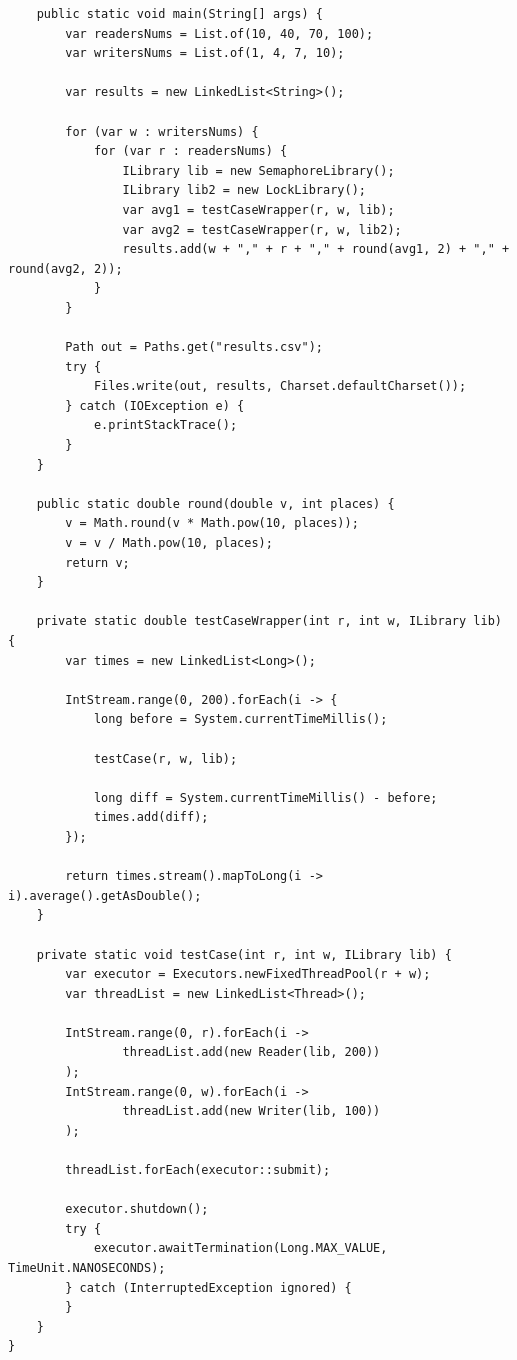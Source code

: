 \documentclass[12pt]{article}
\begin{document}
\begin{verbatim}
    public static void main(String[] args) {
        var readersNums = List.of(10, 40, 70, 100);
        var writersNums = List.of(1, 4, 7, 10);

        var results = new LinkedList<String>();

        for (var w : writersNums) {
            for (var r : readersNums) {
                ILibrary lib = new SemaphoreLibrary();
                ILibrary lib2 = new LockLibrary();
                var avg1 = testCaseWrapper(r, w, lib);
                var avg2 = testCaseWrapper(r, w, lib2);
                results.add(w + "," + r + "," + round(avg1, 2) + "," + round(avg2, 2));
            }
        }

        Path out = Paths.get("results.csv");
        try {
            Files.write(out, results, Charset.defaultCharset());
        } catch (IOException e) {
            e.printStackTrace();
        }
    }

    public static double round(double v, int places) {
        v = Math.round(v * Math.pow(10, places));
        v = v / Math.pow(10, places);
        return v;
    }

    private static double testCaseWrapper(int r, int w, ILibrary lib) {
        var times = new LinkedList<Long>();

        IntStream.range(0, 200).forEach(i -> {
            long before = System.currentTimeMillis();

            testCase(r, w, lib);

            long diff = System.currentTimeMillis() - before;
            times.add(diff);
        });

        return times.stream().mapToLong(i -> i).average().getAsDouble();
    }

    private static void testCase(int r, int w, ILibrary lib) {
        var executor = Executors.newFixedThreadPool(r + w);
        var threadList = new LinkedList<Thread>();

        IntStream.range(0, r).forEach(i ->
                threadList.add(new Reader(lib, 200))
        );
        IntStream.range(0, w).forEach(i ->
                threadList.add(new Writer(lib, 100))
        );

        threadList.forEach(executor::submit);

        executor.shutdown();
        try {
            executor.awaitTermination(Long.MAX_VALUE, TimeUnit.NANOSECONDS);
        } catch (InterruptedException ignored) {
        }
    }
}
\end{verbatim}
\end{document}
